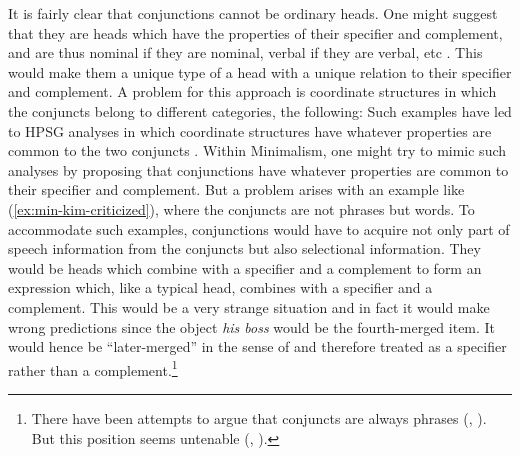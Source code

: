 \documentclass[output=paper]{langsci/langscibook}
\begin{document}
It is fairly clear that conjunctions cannot be ordinary heads. One might suggest that they are heads
which have the properties of their specifier and complement, and are thus nominal if they are
nominal, verbal if they are verbal, etc \citep{Steedman91a}. This would make them a unique type of a head with a unique
relation to their specifier and complement. A problem for this approach is coordinate structures in
which the conjuncts belong to different categories, \eg the following: 
\eal
{}\label{ex:min-hobbs-linguist}
\label{ex:min-hobbs-angry}
\zl 
Such examples have led to HPSG analyses in which coordinate structures have whatever properties are
common to the two conjuncts \citep{Sag2003a-u}. Within Minimalism, one might try to mimic such
analyses by proposing that conjunctions have whatever properties are common to their specifier and
complement. But a problem arises with an example like (\ref{ex:min-kim-criticized}), where the conjuncts are
not phrases but words.
\label{ex:min-kim-criticized}
\z
To accommodate such examples, conjunctions would have to acquire not only part of speech information
from the conjuncts but also selectional information. They would be heads which combine with a
specifier and a complement to form an expression which, like a typical head, combines with a
specifier and a complement. This would be a very strange situation and in fact it would make wrong
predictions since the object \emph{his boss} would be the fourth-merged item. It would hence be
``later-merged'' in the sense of \citet[]{Chomsky2008a} and therefore treated as a specifier rather than a complement.\footnote{%
	There have been attempts to argue that conjuncts are always phrases (\citealt{Kayne94a-u}, \citealt{Bruening2018a}). But this position seems untenable (\citealt{Abeille2006a}, \citealt[Section~7]{MuellerLexicalism}).%
}
\end{document}

